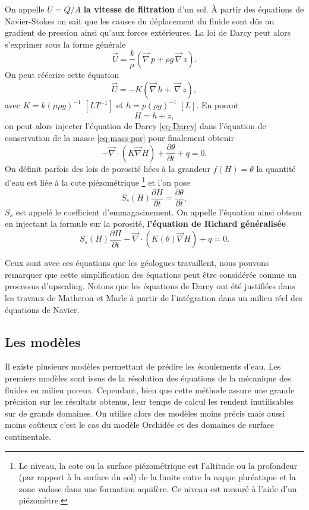 \documentclass[a4paper,11pt]{article}
\begin{document}
On appelle $U=Q/A$ \textbf{la vitesse de filtration} d'un sol. À partir des équations de Navier-Stokes on sait que les causes du déplacement du fluide sont dûs au gradient de pression ainsi qu'aux forces extérieures. La loi de Darcy peut alors s'exprimer sous la forme générale
\begin{equation}
	\label{eq-Darcy}
	\overrightarrow{U}=\frac{k}{\mu }(\overrightarrow{\nabla}\, p+\rho g \,\overrightarrow{\nabla}\, z).
\end{equation} 
On peut réécrire cette équation
\[\overrightarrow{U}=-K(\overrightarrow{\nabla}\, h + \,\overrightarrow{\nabla}\, z),\]
avec $K=k(\mu \rho g)^{-1}$ $[LT^{-1}]$ et $h=p(\rho g)^{-1}$ $[L]$. En posant 
\[H=h+z,\]
on peut alors injecter l'équation de Darcy \eqref{eq-Darcy} dans l'équation de conservation de la masse \eqref{eq-mass-por} pour finalement obtenir
\begin{equation}
	\label{eq-Richards}
	-\overrightarrow{\nabla} \cdot (K\overrightarrow{\nabla}H)+\frac{\partial\theta}{\partial t}+ q=0.
\end{equation}  
On définit parfois des lois de porosité liées à la grandeur $f(H)=\theta$ la quantité d'eau est liée à la cote piézométrique \footnote{Le niveau, la cote ou la surface piézométrique est l'altitude ou la profondeur (par rapport à la surface du sol) de la limite entre la nappe phréatique et la zone vadose dans une formation aquifère. Ce niveau est mesuré à l'aide d'un piézomètre.} et l'on pose 
\[S_s(H)\frac{\partial H}{\partial t}=\frac{\partial\theta}{\partial t},\]
$S_s$ est appelé le coefficient d'emmagasinement. On appelle l'équation ainsi obtenu en injectant la formule sur la porosité, \textbf{l'équation de Richard généralisée}
\begin{equation}
	\label{eq-ge-richard}
	S_s(H)\frac{\partial H}{\partial t}-\overrightarrow{\nabla} \cdot (K(\theta)\overrightarrow{\nabla}H)+q=0.
\end{equation}

Ceux sont avec ces équations que les géologues travaillent, nous pouvons remarquer que cette simplification des équations peut être considérée comme un processus d'upscaling. Notons que les équations de Darcy ont été justifiées dans les travaux de Matheron et Marle à partir de l'intégration dans un milieu réel des équations de Navier. 


\subsection{Les modèles}
Il existe plusieurs modèles permettant de prédire les écoulements d'eau. Les premiers modèles sont issus de la résolution des équations de la mécanique des fluides en milieu poreux. Cependant, bien que cette méthode assure une grande précision sur les résultats obtenus, leur temps de calcul les rendent inutilisables sur de grands domaines. On utilise alors des modèles moins précis mais aussi moins coûteux c'est le cas du modèle Orchidée et des domaines de surface continentale.
\end{document}
